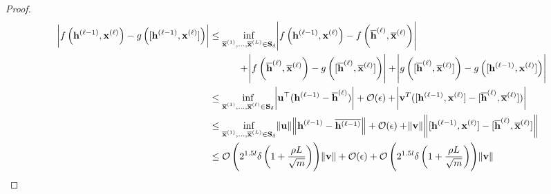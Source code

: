 \begin{proof}
	\iffalse
	\begin{align*}
		\abs{f\left(\mathbf{h}^{(\ell-1)}, \mathbf{x}^{(\ell)}\right) - g\left([\mathbf{h}^{(\ell-1)}, \mathbf{x}^{(\ell)}]\right)} &\le 
		\inf_{\overline{\mathbf{x}}^{(1)}, ..., \overline{\mathbf{x}}^{(L)} \in \mathbf{S}_{\delta}} 
		\abs{f\left(\mathbf{h}^{(\ell-1)}, \mathbf{x}^{(\ell)}\right) - f\left(\overline{\mathbf{h}}^{(\ell)}, \overline{\mathbf{x}}^{(\ell)}\right)}
		\\&\quad \quad \quad+ \abs{f\left(\overline{\mathbf{h}}^{(\ell)}, \overline{\mathbf{x}}^{(\ell)}\right) - g\left([\overline{\mathbf{h}}^{(\ell)}, \overline{\mathbf{x}}^{(\ell)}]\right)}
		+ \abs{g\left([\overline{\mathbf{h}}^{(\ell)}, \overline{\mathbf{x}}^{(\ell)}]\right) - g\left([\mathbf{h}^{(\ell-1)}, \mathbf{x}^{(\ell)}]\right)}
		\\&\le \inf_{\overline{\mathbf{x}}^{(1)}, ..., \overline{\mathbf{x}}^{(\ell)} \in \mathbf{S}_{\delta}}  \abs{ \mathbf{u}^{\top} (\mathbf{h}^{(\ell-1)} - \overline{\mathbf{h}}^{(\ell)}) } + \mathcal{O}(\epsilon) + \abs{\mathbf{v}^T ([\mathbf{h}^{(\ell-1)}, \mathbf{x}^{(\ell)}] - [\overline{\mathbf{h}}^{(\ell)}, \overline{\mathbf{x}}^{(\ell)}])} 
		\\&\le \inf_{\overline{\mathbf{x}}^{(1)}, ..., \overline{\mathbf{x}}^{(L)} \in \mathbf{S}_{\delta}} \norm{\mathbf{u}} \norm{\mathbf{h}^{(\ell-1)} - \overline{\mathbf{h}^{(\ell-1)}}}  + \mathcal{O}(\epsilon) + \norm{\mathbf{v}} \norm{[\mathbf{h}^{(\ell-1)}, \mathbf{x}^{(\ell)}] - [\overline{\mathbf{h}}^{(\ell)}, \overline{\mathbf{x}}^{(\ell)}]} 
		\\& \le \mathcal{O}\left(2^{1.5l} \delta \left(1 + \frac{\rho L}{\sqrt{m}}\right)\right) \norm{\mathbf{v}} + \mathcal{O}(\epsilon) +  \mathcal{O}\left(2^{1.5l} \delta \left(1 + \frac{\rho L}{\sqrt{m}}\right)\right) \norm{\mathbf{v}}

\end{align*}
\end{proof}

